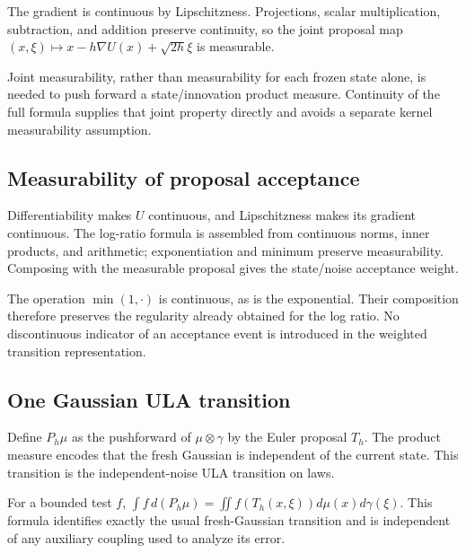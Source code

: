 \documentclass[11pt,a4paper]{report}
\begin{document}
The gradient is continuous by Lipschitzness. Projections, scalar multiplication, subtraction, and addition preserve continuity, so the joint proposal map \((x,\xi)\mapsto x-h\nabla U(x)+\sqrt{2h}\xi\) is measurable.



Joint measurability, rather than measurability for each frozen state alone, is needed to push forward a state/\allowbreak{}innovation product measure. Continuity of the full formula supplies that joint property directly and avoids a separate kernel measurability assumption.

\subsection{\texorpdfstring{Measurability of proposal acceptance}{Measurability of proposal acceptance}}
\label{report-step-UnadjustedLangevin-MALACoupling-lean-6}


Differentiability makes \(U\) continuous, and Lipschitzness makes its gradient continuous. The log-ratio formula is assembled from continuous norms, inner products, and arithmetic; exponentiation and minimum preserve measurability. Composing with the measurable proposal gives the state/\allowbreak{}noise acceptance weight.



The operation \(\min(1,\cdot)\) is continuous, as is the exponential. Their composition therefore preserves the regularity already obtained for the log ratio. No discontinuous indicator of an acceptance event is introduced in the weighted transition representation.

\subsection{\texorpdfstring{One Gaussian ULA transition}{One Gaussian ULA transition}}
\label{report-step-UnadjustedLangevin-MALACoupling-lean-7}


Define \(P_h\mu\) as the pushforward of \(\mu\otimes\gamma\) by the Euler proposal \(T_h\). The product measure encodes that the fresh Gaussian is independent of the current state. This transition is the independent-noise ULA transition on laws.



For a bounded test \(f\), \(\int f\,d(P_h\mu)=\iint f(T_h(x,\xi))d\mu(x)d\gamma(\xi)\). This formula identifies exactly the usual fresh-Gaussian transition and is independent of any auxiliary coupling used to analyze its error.
\end{document}
